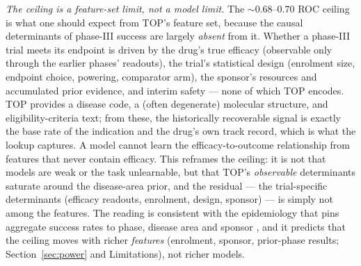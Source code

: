\documentclass[a4paper,fleqn]{cas-sc}
\begin{document}
\emph{The ceiling is a feature-set limit, not a model limit.} The $\sim0.68$--$0.70$ ROC ceiling is
what one should expect from TOP's feature set, because the causal determinants of phase-III
success are largely \emph{absent} from it. Whether a phase-III trial meets its endpoint is driven
by the drug's true efficacy (observable only through the earlier phases' readouts), the trial's
statistical design (enrolment size, endpoint choice, powering, comparator arm), the sponsor's
resources and accumulated prior evidence, and interim safety --- none of which TOP encodes. TOP
provides a disease code, a (often degenerate) molecular structure, and eligibility-criteria text;
from these, the historically recoverable signal is exactly the base rate of the indication and the
drug's own track record, which is what the lookup captures. A model cannot learn the
efficacy-to-outcome relationship from features that never contain efficacy. This reframes the
ceiling: it is not that models are weak or the task unlearnable, but that TOP's \emph{observable}
determinants saturate around the disease-area prior, and the residual --- the trial-specific
determinants (efficacy readouts, enrolment, design, sponsor) --- is simply not among the features. The reading is consistent with the epidemiology that pins
aggregate success rates to phase, disease area and sponsor \citep{hay2014clinical,wong2019estimation},
and it predicts that the ceiling moves with richer \emph{features} (enrolment, sponsor,
prior-phase results; Section~\ref{sec:power} and Limitations), not richer models.
\end{document}
